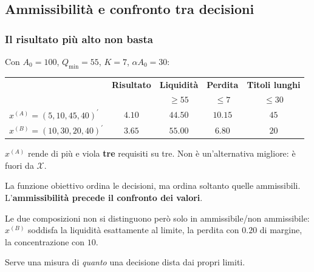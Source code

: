 

\subsection{Ammissibilit\`{a} e confronto tra decisioni}%

\begin{frame}%
%

\frametitle{Il risultato pi\`{u} alto non basta}%
%

%


Con $A_{0}=100$, $Q_{\min}=55$, $K=7$, $\alpha A_{0}=30$:

\medskip

\begin{center}
{\small
\begin{tabular}
[c]{lcccc}\hline
& \textbf{Risultato} & \textbf{Liquidit\`{a}} & \textbf{Perdita} &
\textbf{Titoli lunghi}\\
&  & $\geq55$ & $\leq7$ & $\leq30$\\\hline
$x^{(A)}=(5,10,45,40)^{\prime}$ & $4.10$ & $44.50$ & $10.15$ & $45$\\
$x^{(B)}=(10,30,20,40)^{\prime}$ & $3.65$ & $55.00$ & $6.80$ & $20$\\\hline
\end{tabular}
}
\end{center}

\medskip

\begin{stepitemize}
\item $x^{(A)}$ rende di pi\`{u} e viola \textbf{tre} requisiti su tre. Non
\`{e} un'alternativa migliore: \`{e} fuori da $\mathcal{X}$.

\item La funzione obiettivo ordina le decisioni, ma ordina soltanto quelle
ammissibili. L'\textbf{ammissibilit\`{a} precede il confronto dei valori}.

\item Le due composizioni non si distinguono per\`{o} solo in ammissibile/non
ammissibile: $x^{(B)}$ soddisfa la liquidit\`{a} esattamente al limite, la
perdita con $0.20$ di margine, la concentrazione con $10$.
\end{stepitemize}

\medskip

\begin{center}
{\small Serve una misura di \emph{quanto} una decisione dista dai propri
limiti.}
\end{center}

%

\transboxout
\end{frame}%


